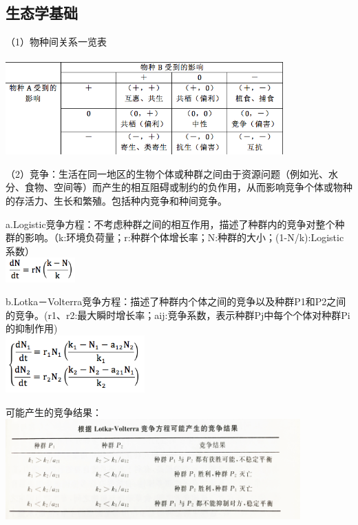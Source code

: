 \documentclass[8pt]{article}
\begin{document}
\subsection{生态学基础}
（1）物种间关系一览表\\\\
\includegraphics[width=0.8\textwidth]{2.png}\\
\begin{description}
      \item（2）竞争：生活在同一地区的生物个体或种群之间由于资源问题（例如光、水分、食物、空间等）而产生的相互阻碍或制约的负作用，从而影响竞争个体或物种的存活力、生长和繁殖。包括种内竞争和种间竞争。
      \item a.Logistic竞争方程：不考虑种群之间的相互作用，描述了种群内的竞争对整个种群的影响。（k:环境负荷量；r:种群个体增长率；N:种群的大小；(1-N/k):Logistic系数）\\
      \includegraphics[width=0.2\textwidth]{3.png}      
      \item b.Lotka－Volterra竞争方程：描述了种群内个体之间的竞争以及种群P1和P2之间的竞争。(r1、r2:最大瞬时增长率；aij:竞争系数，表示种群Pj中每个个体对种群Pi的抑制作用)\\
      \includegraphics[width=0.4\textwidth]{4.png}
      \item 可能产生的竞争结果：\\
      \includegraphics[width=0.85\textwidth]{5.png} \\

\end{description}
\end{document}
